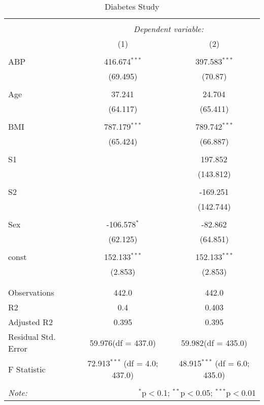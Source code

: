\documentclass[12pt]{article}
\numberwithin{equation}{subsection}
\begin{document}
\begin{table}[!htbp] \centering
  \caption{Diabetes Study}
  \label{}
\begin{tabular}{@{\extracolsep{5pt}}lcc}
\\[-1.8ex]\hline
\hline \\[-1.8ex]
& \multicolumn{2}{c}{\textit{Dependent variable:}} \
\cr \cline{2-3}
\\[-1.8ex] & (1) & (2) \\
\hline \\[-1.8ex]
 ABP & 416.674$^{***}$ & 397.583$^{***}$ \\
  & (69.495) & (70.87) \\
  & & \\
 Age & 37.241$^{}$ & 24.704$^{}$ \\
  & (64.117) & (65.411) \\
  & & \\
 BMI & 787.179$^{***}$ & 789.742$^{***}$ \\
  & (65.424) & (66.887) \\
  & & \\
 S1 & & 197.852$^{}$ \\
  & & (143.812) \\
  & & \\
 S2 & & -169.251$^{}$ \\
  & & (142.744) \\
  & & \\
 Sex & -106.578$^{*}$ & -82.862$^{}$ \\
  & (62.125) & (64.851) \\
  & & \\
 const & 152.133$^{***}$ & 152.133$^{***}$ \\
  & (2.853) & (2.853) \\
  & & \\
\hline \\[-1.8ex]
 Observations & 442.0 & 442.0 \\
 R${2}$ & 0.4 & 0.403 \\
 Adjusted R${2}$ & 0.395 & 0.395 \\
 Residual Std. Error & 59.976(df = 437.0) & 59.982(df = 435.0)  \\
 F Statistic & 72.913$^{***}$ (df = 4.0; 437.0) & 48.915$^{***}$ (df = 6.0; 435.0) \\
\hline
\hline \\[-1.8ex]
\textit{Note:} & \multicolumn{2}{r}{$^{*}$p$<$0.1; $^{**}$p$<$0.05; $^{***}$p$<$0.01} \\
\end{tabular}
\end{table}
 
\end{document}
